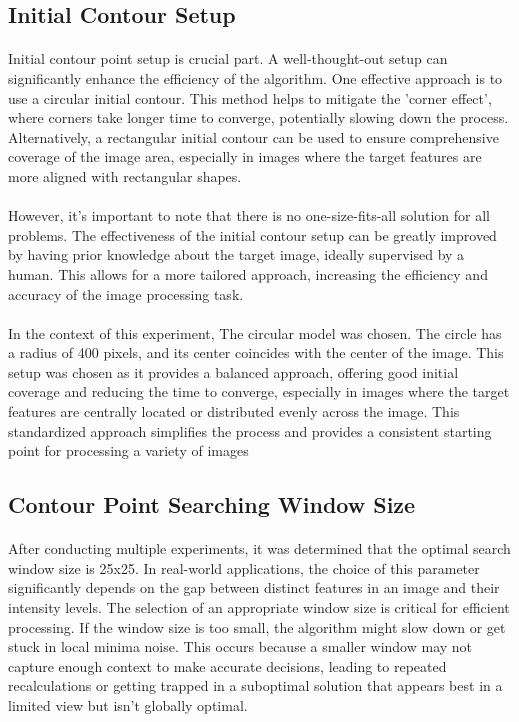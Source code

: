 \documentclass[12pt,a4paper]{report}
\begin{document}
\subsection{Initial Contour Setup}
\paragraph*{}
Initial contour point setup is crucial part. A well-thought-out setup can significantly enhance the efficiency of the algorithm. One effective approach is to use a circular initial contour. This method helps to mitigate the 'corner effect', where corners take longer time to converge, potentially slowing down the process. Alternatively, a rectangular initial contour can be used to ensure comprehensive coverage of the image area, especially in images where the target features are more aligned with rectangular shapes.
\paragraph*{}
However, it's important to note that there is no one-size-fits-all solution for all problems. The effectiveness of the initial contour setup can be greatly improved by having prior knowledge about the target image, ideally supervised by a human. This allows for a more tailored approach, increasing the efficiency and accuracy of the image processing task.
\paragraph*{}
In the context of this experiment, The circular model was chosen. The circle has a radius of 400 pixels, and its center coincides with the center of the image. This setup was chosen as it provides a balanced approach, offering good initial coverage and reducing the time to converge, especially in images where the target features are centrally located or distributed evenly across the image. This standardized approach simplifies the process and provides a consistent starting point for processing a variety of images

\subsection{Contour Point Searching Window Size}
\paragraph*{}
After conducting multiple experiments, it was determined that the optimal search window size is 25x25. In real-world applications, the choice of this parameter significantly depends on the gap between distinct features in an image and their intensity levels. The selection of an appropriate window size is critical for efficient processing. If the window size is too small, the algorithm might slow down or get stuck in local minima noise. This occurs because a smaller window may not capture enough context to make accurate decisions, leading to repeated recalculations or getting trapped in a suboptimal solution that appears best in a limited view but isn't globally optimal.
\end{document}
